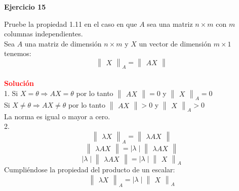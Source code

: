 \documentclass[12pt]{article}
\begin{document}
\noindent \textbf{Ejercicio 15}

Pruebe la propiedad 1.11 en el caso en que $A$ sea una matriz $n \times m$ con $m$ columnas independientes.\\
Sea $A$ una matriz de dimensión $n \times m$ y $X$ un vector de dimensión $m \times 1$ tenemos:
$$
\begin{Vmatrix} X \end{Vmatrix}_A=\begin{Vmatrix} AX \end{Vmatrix}
$$
\\
\noindent \textcolor{red}{\bf Soluci\'on}\\
1. Si $X=\theta \Rightarrow AX = \theta $ por lo tanto  $\begin{Vmatrix} AX \end{Vmatrix}=0$ y $\begin{Vmatrix} X \end{Vmatrix}_A=0$ \\
Si $X \neq \theta \Rightarrow AX \neq \theta $ por lo tanto $\begin{Vmatrix} AX \end{Vmatrix}>0$ y $\begin{Vmatrix} X \end{Vmatrix}_A>0$ \\
La norma es igual o mayor a cero.\\

2.\\
$$\begin{Vmatrix} \lambda X \end{Vmatrix}_A=\begin{Vmatrix} \lambda AX \end{Vmatrix}$$
$$\begin{Vmatrix} \lambda AX \end{Vmatrix}= \mid \lambda \mid \begin{Vmatrix} \lambda AX \end{Vmatrix}$$
$$\mid \lambda \mid \begin{Vmatrix} \lambda AX \end{Vmatrix}=\mid \lambda \mid \begin{Vmatrix} X \end{Vmatrix}_A$$
Cumpliéndose la propiedad del producto de un escalar:
$$\begin{Vmatrix} \lambda X \end{Vmatrix}_A=\mid \lambda \mid \begin{Vmatrix} X \end{Vmatrix}_A$$
\end{document}
